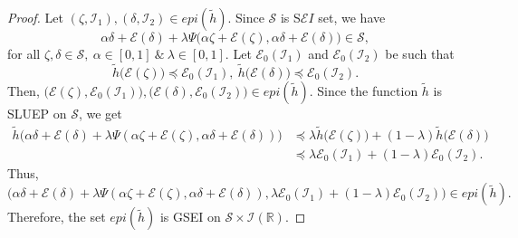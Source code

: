 \documentclass[12pt, reqno]{amsart}
\theoremstyle{definition}
\theoremstyle{remark}
\numberwithin{equation}{section}
\begin{document}
       \begin{proof}
       	Let $(\mathit{\zeta} ,\mathcal{I}_1),(\mathit{\delta} ,\mathcal{I}_2)\in epi(\tilde{h})$. Since ${\mathcal{S}}$ is S$\mathcal{E}I$ set, we have 
       	$$ {\alpha} \mathit{\delta} + {\mathcal{E}} (\mathit{\delta} )+ { \lambda} {\Psi}\big( {\alpha} \mathit{\zeta} + {\mathcal{E}}(\mathit{\zeta} ), {\alpha} \mathit{\delta} + {\mathcal{E}} (\mathit{\delta} )\big)\in{\mathcal{S}},$$ 
      for all $\mathit{\zeta} ,\mathit{\delta} \in {\mathcal{S}},~{\alpha}\in {[0,1]}~\&~{\lambda}\in {[0,1]} $. Let $ {\mathcal{E}}_{0}(\mathcal{I}_1)$ and $ {\mathcal{E}}_{0}(\mathcal{I}_2)$ be such that $$ \tilde{h}\big( {\mathcal{E}}(\mathit{\zeta} )\big)\preceq  {\mathcal{E}}_{0}(\mathcal{I}_1),~ \tilde{h}\big( {\mathcal{E}} (\mathit{\delta} )\big)\preceq  {\mathcal{E}}_{0}(\mathcal{I}_2).$$
       	Then,   $\big( {\mathcal{E}}(\mathit{\zeta} ), {\mathcal{E}}_{0}(\mathcal{I}_1)\big),\big( {\mathcal{E}} (\mathit{\delta} ), {\mathcal{E}}_{0}(\mathcal{I}_2)\big)\in epi( \tilde{h})$.
       	Since the function $\tilde{h}$ is SLUEP on $ {\mathcal{S}}$, we get
       	\begin{equation*}
       	    \begin{aligned}
       	        \tilde{h}\big({\alpha}  \mathit{\delta} + {\mathcal{E}}( \mathit{\delta} )+ {\lambda} {\Psi}( {\alpha}  \mathit{\zeta} + {\mathcal{E}}( \mathit{\zeta} ), {\alpha}  \mathit{\delta} + {\mathcal{E}}( \mathit{\delta} ))\big)&\preceq  {\lambda}  \tilde{h}\big( {\mathcal{E}}( \mathit{\zeta} )\big)+(1- {\lambda}) \tilde{h}\big( {\mathcal{E}}( \mathit{\delta} )\big)\\
       		&\preceq  {\lambda}  {\mathcal{E}}_{0}(\mathcal{I}_1)+(1- {\lambda}) {\mathcal{E}}_{0}(\mathcal{I}_2).
       	    \end{aligned}
       	\end{equation*}
       	Thus, 
       	$$\big({\alpha} \mathit{\delta} + {\mathcal{E}}( \mathit{\delta} )+ {\lambda} {\Psi}( {\alpha}  \mathit{\zeta} + {\mathcal{E}}( \mathit{\zeta} ), {\alpha}  \mathit{\delta} +{\mathcal{E}}( \mathit{\delta} )), {\lambda}{\mathcal{E}}_{0}(\mathcal{I}_1)+(1- {\lambda}) {\mathcal{E}}_{0}(\mathcal{I}_2)\big)\in epi(\tilde{h}).$$
       	Therefore, the set $epi(\tilde{h})$ is GSEI on $ {\mathcal{S}}\times \mathcal{I}(\mathbb{R})$.
       	

\end{proof}
\end{document}
